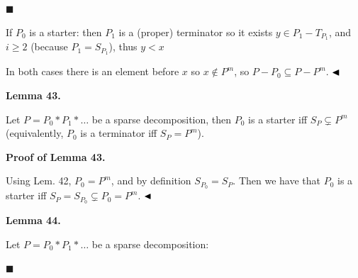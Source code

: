  
\par\noindent  $\blacksquare$ 
 
If $P_{0}$ is a starter: then $P_{1}$ is a (proper) terminator so it exists $y\in P_{1}-T_{P_{1}}$, and $i\geqslant 2$ (because $P_{1}=S_{P_{1}}$), thus $y<x$\par
 
 
  
In both cases there is an element before $x$ so $x\not\in P^{m}$, so $P-P_{0}\subseteq P-P^{m}$. $\hfill\blacktriangleleft$\par
 
 
 
\par\medskip\noindent\textbf{Lemma 43.}\par
 
 
Let $P=P_{0}*P_{1}*\dots$ be a sparse decomposition, then $P_{0}$ is a starter iff $S_{P}\subsetneq P^{m}$ (equivalently, $P_{0}$ is a terminator iff $S_{P}=P^{m}$).\par
 
 
 
 
 
\par\medskip\noindent\textbf{Proof of Lemma 43.}\par
 
 
Using Lem. 42, $P_{0}=P^{m}$, and by definition $S_{P_{0}}=S_{P}$. Then we have that $P_{0}$ is a starter iff $S_{P}=S_{P_{0}}\subsetneq P_{0}=P^{m}$. $\hfill\blacktriangleleft$\par
 
 
 
\par\medskip\noindent\textbf{Lemma 44.}\par
 
 
Let $P=P_{0}*P_{1}*\dots$ be a sparse decomposition:\par
  
\par\noindent  $\blacksquare$ 
 
